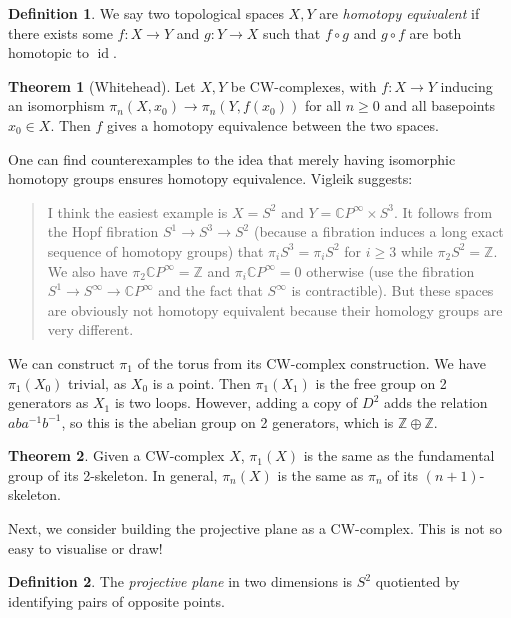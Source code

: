 \documentclass[a4paper,12pt]{article}
\newcommand{\ZZ}{\mathbb{Z}}
\newcommand{\CC}{\mathbb{C}}
\newcommand{\of}{\circ}
\theoremstyle{definition}
\newtheorem*{thm}{Theorem}
\newtheorem*{defn}{Definition}
\begin{document}
\begin{defn}
	We say two topological spaces $X, Y$ are \emph{homotopy equivalent} if there exists some $f: X\to Y$ and $g: Y\to X$ such that $f\of g$ and $g\of f$ are both homotopic to $\operatorname{id}$.
\end{defn}

\begin{thm}[Whitehead]
	Let $X, Y$ be CW-complexes, with $f: X\to Y$ inducing an isomorphism $\pi_n(X, x_0) \to \pi_n(Y, f(x_0))$ for all $n \geq 0$ and all basepoints $x_0 \in X$.
	Then $f$ gives a homotopy equivalence between the two spaces.
\end{thm}

One can find counterexamples to the idea that merely having isomorphic homotopy groups ensures homotopy equivalence. Vigleik suggests:
\begin{quote}
I think the easiest example is $X = S^2$ and $Y = \CC P^\infty \times S^3$. It follows from the Hopf fibration $S^1 \to S^3 \to S^2$ (because a fibration induces a long exact sequence of homotopy groups) that $\pi_i S^3 = \pi_i S^2$ for $i \geq 3$ while $\pi_2 S^2 = \ZZ$. We also have $\pi_2 \CC P^\infty = \ZZ$ and $\pi_i \CC P^\infty = 0$ otherwise (use the fibration $S^1 \to S^\infty \to \CC P^\infty$ and the fact that $S^\infty$ is contractible). But these spaces are obviously not homotopy equivalent because their homology groups are very different.
\end{quote}


We can construct $\pi_1$ of the torus from its CW-complex construction.
We have $\pi_1(X_0)$ trivial, as $X_0$ is a point.
Then $\pi_1(X_1)$ is the free group on 2 generators as $X_1$ is two loops.
However, adding a copy of $D^2$ adds the relation $aba^{-1}b^{-1}$, so this is the abelian group on 2 generators, which is $\ZZ\oplus\ZZ$. 

\begin{thm}
	Given a CW-complex $X$, $\pi_1(X)$ is the same as the fundamental group of its 2-skeleton.
	In general, $\pi_n(X)$ is the same as $\pi_n$ of its $(n+1)$-skeleton.
\end{thm}

Next, we consider building the projective plane as a CW-complex.
This is not so easy to visualise or draw!

\begin{defn}
The \emph{projective plane} in two dimensions is $S^2$ quotiented by identifying pairs of opposite points.
\end{defn}
\end{document}
